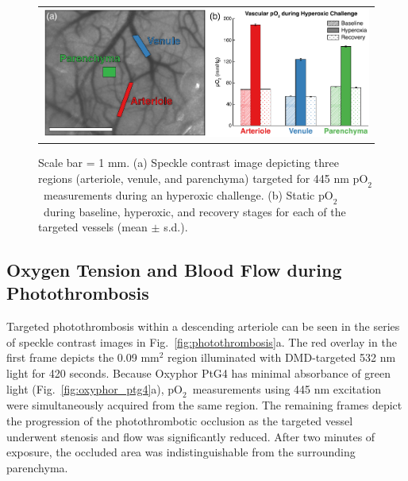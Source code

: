 \documentclass[12pt]{spieman}  %
\newcommand{\pO}{\ensuremath{\text{pO}_2}} 	            %
\begin{document}
\begin{spacing}{2}
\begin{figure}
    \begin{center}
        \begin{tabular}{c}
            \includegraphics[width=6.25in]{Figure4.pdf}
        \end{tabular}
    \end{center}
    \caption {
        \label{fig:hyperoxic_challenge}
        Scale bar = 1 mm. (a) Speckle contrast image depicting three regions (arteriole, venule, and parenchyma) targeted for 445 nm \pO\ measurements during an hyperoxic challenge. (b) Static \pO\ during baseline, hyperoxic, and recovery stages for each of the targeted vessels (mean $\pm$ s.d.).
    }
\end{figure}


\subsection{Oxygen Tension and Blood Flow during Photothrombosis}
Targeted photothrombosis within a descending arteriole can be seen in the series of speckle contrast images in Fig.~\ref{fig:photothrombosis}a. The red overlay in the first frame depicts the 0.09 mm$^{2}$ region illuminated with DMD-targeted 532 nm light for 420 seconds. Because Oxyphor PtG4 has minimal absorbance of green light (Fig.~\ref{fig:oxyphor_ptg4}a), \pO\ measurements using 445 nm excitation were simultaneously acquired from the same region. The remaining frames depict the progression of the photothrombotic occlusion as the targeted vessel underwent stenosis and flow was significantly reduced. After two minutes of exposure, the occluded area was indistinguishable from the surrounding parenchyma.


\end{spacing}
\end{document}

